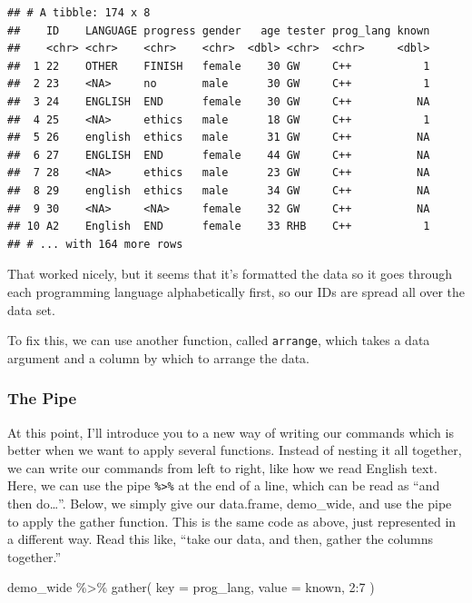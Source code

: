 \documentclass[
]{book}
\newenvironment{Shaded}{\begin{snugshade}}{\end{snugshade}}
\newcommand{\AttributeTok}[1]{\textcolor[rgb]{0.77,0.63,0.00}{#1}}
\newcommand{\DecValTok}[1]{\textcolor[rgb]{0.00,0.00,0.81}{#1}}
\newcommand{\FunctionTok}[1]{\textcolor[rgb]{0.00,0.00,0.00}{#1}}
\newcommand{\NormalTok}[1]{#1}
\newcommand{\SpecialCharTok}[1]{\textcolor[rgb]{0.00,0.00,0.00}{#1}}
\begin{document}
\begin{verbatim}
## # A tibble: 174 x 8
##    ID    LANGUAGE progress gender   age tester prog_lang known
##    <chr> <chr>    <chr>    <chr>  <dbl> <chr>  <chr>     <dbl>
##  1 22    OTHER    FINISH   female    30 GW     C++           1
##  2 23    <NA>     no       male      30 GW     C++           1
##  3 24    ENGLISH  END      female    30 GW     C++          NA
##  4 25    <NA>     ethics   male      18 GW     C++           1
##  5 26    english  ethics   male      31 GW     C++          NA
##  6 27    ENGLISH  END      female    44 GW     C++          NA
##  7 28    <NA>     ethics   male      23 GW     C++          NA
##  8 29    english  ethics   male      34 GW     C++          NA
##  9 30    <NA>     <NA>     female    32 GW     C++          NA
## 10 A2    English  END      female    33 RHB    C++           1
## # ... with 164 more rows
\end{verbatim}

That worked nicely, but it seems that it's formatted the data so it goes through each programming language alphabetically first, so our IDs are spread all over the data set.

To fix this, we can use another function, called \texttt{arrange}, which takes a data argument and a column by which to arrange the data.

\hypertarget{the-pipe}{%
\subsubsection{The Pipe}\label{the-pipe}}

At this point, I'll introduce you to a new way of writing our commands which is better when we want to apply several functions. Instead of nesting it all together, we can write our commands from left to right, like how we read English text. Here, we can use the pipe \texttt{\%\textgreater{}\%} at the end of a line, which can be read as ``and then do\ldots{}''. Below, we simply give our data.frame, demo\_wide, and use the pipe to apply the gather function. This is the same code as above, just represented in a different way. Read this like, ``take our data, and then, gather the columns together.''

\begin{Shaded}
\begin{Highlighting}[]
\NormalTok{demo\_wide }\SpecialCharTok{\%\textgreater{}\%} 
  \FunctionTok{gather}\NormalTok{(}
    \AttributeTok{key =}\NormalTok{ prog\_lang,}
    \AttributeTok{value =}\NormalTok{ known,}
    \DecValTok{2}\SpecialCharTok{:}\DecValTok{7}
\NormalTok{    )}
\end{Highlighting}
\end{Shaded}
\end{document}
